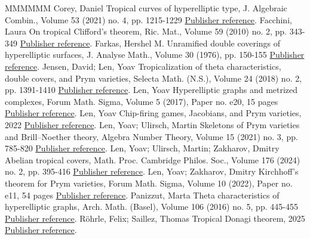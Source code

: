 \begin{thebibliography}{MMMMMM}
 Corey, Daniel Tropical curves of hyperelliptic type, J. Algebraic Combin., Volume 53 (2021) no. 4, pp. 1215-1229 \href{https://alco.centre-mersenne.org/articles/10.5802/alco.452/#C}{Publisher reference}.
 Facchini, Laura On tropical Clifford’s theorem, Ric. Mat., Volume 59 (2010) no. 2, pp. 343-349 \href{https://alco.centre-mersenne.org/articles/10.5802/alco.452/#Facchini_Clifford}{Publisher reference}.
 Farkas, Hershel M. Unramified double coverings of hyperelliptic surfaces, J. Analyse Math., Volume 30 (1976), pp. 150-155 \href{https://alco.centre-mersenne.org/articles/10.5802/alco.452/#HMfarkashypcovers}{Publisher reference}.
 Jensen, David; Len, Yoav Tropicalization of theta characteristics, double covers, and Prym varieties, Selecta Math. (N.S.), Volume 24 (2018) no. 2, pp. 1391-1410 \href{https://alco.centre-mersenne.org/articles/10.5802/alco.452/#JensenLen_thetachars}{Publisher reference}.
 Len, Yoav Hyperelliptic graphs and metrized complexes, Forum Math. Sigma, Volume 5 (2017), Paper no. e20, 15 pages \href{https://alco.centre-mersenne.org/articles/10.5802/alco.452/#Len_Clifford}{Publisher reference}.
 Len, Yoav Chip-firing games, Jacobians, and Prym varieties, 2022 \href{https://alco.centre-mersenne.org/articles/10.5802/alco.452/#Len_Survey}{Publisher reference}.
 Len, Yoav; Ulirsch, Martin Skeletons of Prym varieties and Brill–Noether theory, Algebra Number Theory, Volume 15 (2021) no. 3, pp. 785-820 \href{https://alco.centre-mersenne.org/articles/10.5802/alco.452/#LenUlirsch_Prym}{Publisher reference}.
 Len, Yoav; Ulirsch, Martin; Zakharov, Dmitry Abelian tropical covers, Math. Proc. Cambridge Philos. Soc., Volume 176 (2024) no. 2, pp. 395-416 \href{https://alco.centre-mersenne.org/articles/10.5802/alco.452/#LenUlirschZakharov_abelianCovers}{Publisher reference}.
 Len, Yoav; Zakharov, Dmitry Kirchhoff’s theorem for Prym varieties, Forum Math. Sigma, Volume 10 (2022), Paper no. e11, 54 pages \href{https://alco.centre-mersenne.org/articles/10.5802/alco.452/#LZ22}{Publisher reference}.
 Panizzut, Marta Theta characteristics of hyperelliptic graphs, Arch. Math. (Basel), Volume 106 (2016) no. 5, pp. 445-455 \href{https://alco.centre-mersenne.org/articles/10.5802/alco.452/#Panizzut}{Publisher reference}.
 Röhrle, Felix; Saillez, Thomas Tropical Donagi theorem, 2025 \href{https://alco.centre-mersenne.org/articles/10.5802/alco.452/#RohrleSaillez_Donagi}{Publisher reference}.

\end{thebibliography}

